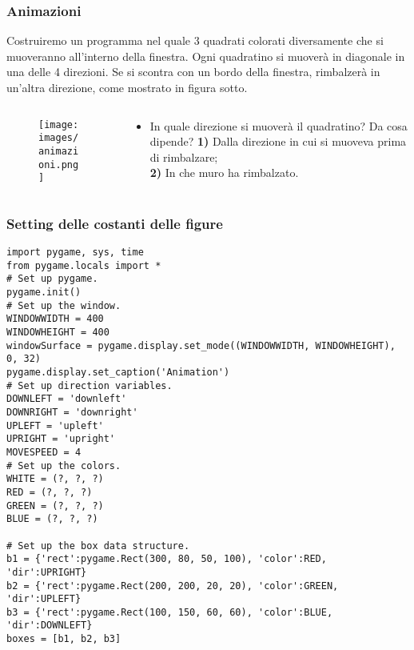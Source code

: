 \documentclass{beamer}
\begin{document}
\begin{frame}[fragile]
\frametitle{Animazioni}
Costruiremo un programma nel quale 3 quadrati colorati diversamente che si muoveranno all'interno della finestra. Ogni quadratino si muoverà in diagonale in una delle 4 direzioni. Se si scontra con un bordo della finestra, rimbalzerà in un'altra direzione, come mostrato in figura sotto.
\begin{columns}
	\begin{column}[T]{0.5\textwidth}
		\begin{figure}[t]
			\texttt{[image: images/animazioni.png]}
		\end{figure}
	\end{column}
	\begin{column}[T]{0.5\textwidth}
		\begin{itemize}
			\item In quale direzione si muoverà il quadratino? Da cosa dipende?
			\textbf{1)} Dalla direzione in cui si muoveva prima di rimbalzare; \\
			\textbf{2)} In che muro ha rimbalzato.
		\end{itemize}
	\end{column}
\end{columns}
\end{frame}

\begin{frame}[fragile]
\frametitle{Setting delle costanti delle figure}
\lstset{basicstyle=\tiny}
	\begin{lstlisting}
import pygame, sys, time
from pygame.locals import *
# Set up pygame.
pygame.init()
# Set up the window.
WINDOWWIDTH = 400
WINDOWHEIGHT = 400
windowSurface = pygame.display.set_mode((WINDOWWIDTH, WINDOWHEIGHT), 0, 32)
pygame.display.set_caption('Animation')
# Set up direction variables.
DOWNLEFT = 'downleft'
DOWNRIGHT = 'downright'
UPLEFT = 'upleft'
UPRIGHT = 'upright'
MOVESPEED = 4
# Set up the colors.
WHITE = (?, ?, ?)
RED = (?, ?, ?)
GREEN = (?, ?, ?)
BLUE = (?, ?, ?)

# Set up the box data structure.
b1 = {'rect':pygame.Rect(300, 80, 50, 100), 'color':RED, 'dir':UPRIGHT}
b2 = {'rect':pygame.Rect(200, 200, 20, 20), 'color':GREEN, 'dir':UPLEFT}
b3 = {'rect':pygame.Rect(100, 150, 60, 60), 'color':BLUE, 'dir':DOWNLEFT}
boxes = [b1, b2, b3]
	\end{lstlisting}
\end{frame}
\end{document}
